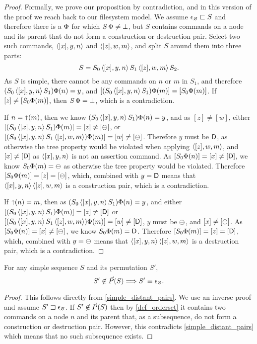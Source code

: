 \begin{proof}
Formally, we prove our proposition by contradiction,
and in this version of the proof we reach back to our filesystem model.
We assume $\epsilon_\varnothing\sqsubset{S}$ and therefore there is a $\Phi$ for which $S\,\Phi\neq\bot$,
but $S$ contains commands on a node and its parent that do not form a construction or destruction pair.
Select two such commands, $\langle{[x],y,n}\rangle$ and $\langle{[z],w,m}\rangle$,
and split $S$ around them into three parts:
\[ S = S_0 \, \langle{[x],y,n}\rangle \, S_1 \, \langle{[z],w,m}\rangle \, S_2. \]
As $S$ is simple, there cannot be any commands on $n$ or $m$ in $S_1$,
and therefore $(S_0\,\langle{[x],y,n}\rangle\, S_1)\Phi(n) = y$,
and $[(S_0\,\langle{[x],y,n}\rangle\, S_1)\Phi(m)] = [S_0\Phi(m)]$.
If $[z]\neq[S_0\Phi(m)]$, then $S\,\Phi=\bot$, which is a contradiction.

If $n=\mathord{\shortuparrow}(m)$, then 
we know $(S_0\,\langle{[x],y,n}\rangle\, S_1)\Phi(n) = y$, and as $[z]\neq[w]$, either
$[(S_0\,\langle{[x],y,n}\rangle\, S_1)\Phi(m)]=[z]\neq[\ominus]$,
or $[(S_0\,\langle{[x],y,n}\rangle\, S_1\,\langle{[z],w,m}\rangle)\Phi(m)]=[w]\neq[\ominus]$.
Therefore $y$ must be $\mathsf{D}$, as otherwise the tree property would be violated
when applying $\langle{[z],w,m}\rangle$,
and $[x]\neq[\mathsf{D}]$ as $\langle{[x],y,n}\rangle$ is not an assertion command.
As $[S_0\Phi(n)]=[x]\neq[\mathsf{D}]$, we know
$S_0\Phi(m)=\ominus$ as otherwise the tree property would be violated.
Therefore $[S_0\Phi(m)]=[z]=[\ominus]$, which, combined with $y=\mathsf{D}$
means that $\langle{[x],y,n}\rangle\,\langle{[z],w,m}\rangle$ is a construction pair, which is a contradiction.

If $\mathord{\shortuparrow}(n)=m$, then 
as $(S_0\,\langle{[x],y,n}\rangle\, S_1)\Phi(n) = y$, and either
$[(S_0\,\langle{[x],y,n}\rangle\, S_1)\Phi(m)]=[z]\neq[\mathsf{D}]$
or $[(S_0\,\langle{[x],y,n}\rangle\, S_1\,\langle{[z],w,m}\rangle)\Phi(m)]=[w]\neq[\mathsf{D}]$,
$y$ must be $\ominus$, and $[x]\neq[\ominus]$.
As $[S_0\Phi(n)]=[x]\neq[\ominus]$, we know $S_0\Phi(m)=\mathsf{D}$.
Therefore $[S_0\Phi(m)]=[z]=[\mathsf{D}]$, which, combined with $y=\ominus$
means that $\langle{[x],y,n}\rangle\,\langle{[z],w,m}\rangle$ is a destruction pair, which is a contradiction.
\end{proof}


\begin{mycor}
For any simple sequence $S$ and its permutation $S'$, 
\[ S'\not\in\vec{P}({S}) \Longrightarrow S'\equiv\epsilon_\varnothing. \]
\end{mycor}
\begin{proof}
This follows directly from \cref{simple_distant_pairs}.
We use an inverse proof and assume ${S'}\sqsupset\epsilon_\varnothing$.
If $S'\not\in\vec{P}({S})$ then by \cref{def_orderset}
it contains two commands on a node $n$ and its parent
that, as a subsequence,
do not form a construction or destruction pair.
However, this contradicts \cref{simple_distant_pairs}
which means that no such subsequence exists.
\end{proof}



